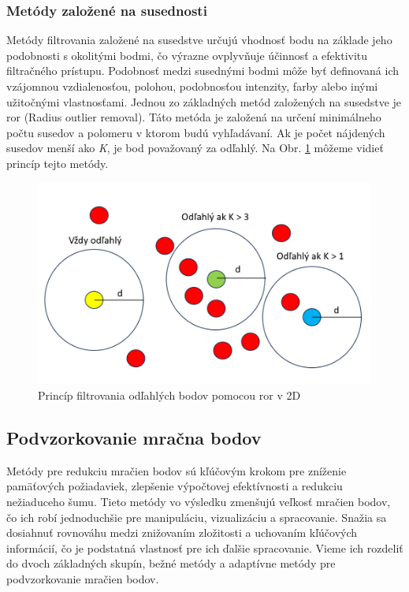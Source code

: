 \subsubsection{Metódy založené na susednosti} \label{section::ror}
\noindent Metódy filtrovania založené na susedstve určujú vhodnosť bodu na základe jeho podobnosti s okolitými bodmi, čo výrazne ovplyvňuje účinnosť a efektivitu filtračného prístupu. Podobnosť medzi susednými bodmi môže byť definovaná ich vzájomnou vzdialenosťou, polohou, podobnosťou intenzity, farby alebo inými užitočnými vlastnosťami. \cite{point_cloud_filtering}
\newline\indent Jednou zo základných metód založených na susedstve je \acrshort{ror} (Radius outlier removal). Táto metóda je založená na určení minimálneho počtu susedov a polomeru v ktorom budú vyhľadávaní. Ak je počet nájdených susedov menší ako \textit{K}, je bod považovaný za odľahlý. Na Obr. \ref{ror_principal} môžeme vidieť princíp tejto metódy.
\begin{figure}[!htbp]
  \centering
  \includegraphics[width=12cm]{img/ros_principal.png}
  \caption{Princíp filtrovania odľahlých bodov pomocou \acrshort{ror} v 2D}
  \label{ror_principal}
\end{figure}

\newpage\subsection{Podvzorkovanie mračna bodov}
\noindent Metódy pre redukciu mračien bodov sú kľúčovým krokom pre zníženie pamäťových požiadaviek, zlepšenie výpočtovej efektívnosti a redukciu nežiaduceho šumu. Tieto metódy vo výsledku zmenšujú veľkosť mračien bodov, čo ich robí jednoduchšie pre manipuláciu, vizualizáciu a spracovanie. Snažia  sa dosiahnuť rovnováhu medzi znižovaním zložitosti a uchovaním kľúčových informácií, čo je podstatná vlastnosť pre ich ďalšie spracovanie. Vieme ich rozdeliť do dvoch základných skupín, bežné metódy a adaptívne metódy pre podvzorkovanie mračien bodov.

